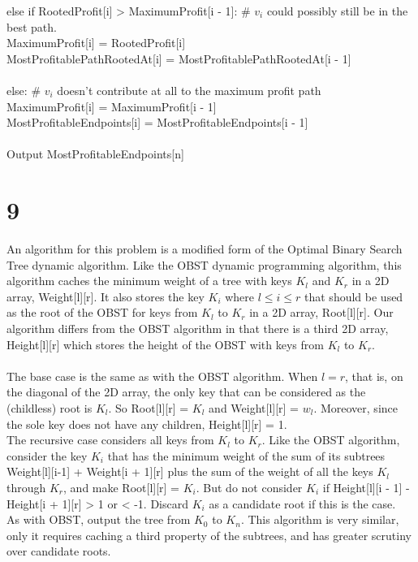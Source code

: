 \documentclass[letterpaper,notitlepage,twoside]{article}
\newcommand\tab[1][1cm]{\hspace*{#1}} %
\begin{document}
\tab else if RootedProfit[i] > MaximumProfit[i - 1]: \# $v_i$ could possibly still be in the best path.\\
\tab\tab MaximumProfit[i] = RootedProfit[i]\\
\tab\tab MostProfitablePathRootedAt[i] = MostProfitablePathRootedAt[i - 1]\\
\\
\tab else: \# $v_i$ doesn't contribute at all to the maximum profit path\\
\tab\tab MaximumProfit[i] = MaximumProfit[i - 1]\\
\tab\tab MostProfitableEndpoints[i] = MostProfitableEndpoints[i - 1]\\
\\
Output MostProfitableEndpoints[n]

\section*{9}
An algorithm for this problem is a modified form of the Optimal Binary Search Tree dynamic algorithm. Like the OBST dynamic programming algorithm, this algorithm caches the minimum weight of a tree with keys $K_l$ and $K_r$ in a 2D array, Weight[l][r]. It also stores the key $K_i$ where $l \leq i \leq r$ that should be used as the root of the OBST for keys from $K_l$ to $K_r$ in a 2D array, Root[l][r]. Our algorithm differs from the OBST algorithm in that there is a third 2D array, Height[l][r] which stores the height of the OBST with keys from $K_l$ to $K_r$.\\
\\
The base case is the same as with the OBST algorithm. When $l = r$, that is, on the diagonal of the 2D array, the only key that can be considered as the (childless) root is $K_l$. So Root[l][r] = $K_l$ and Weight[l][r] = $w_l$. Moreover, since the sole key does not have any children, Height[l][r] = 1.
\\
The recursive case considers all keys from $K_l$ to $K_r$. Like the OBST algorithm, consider the key $K_i$ that has the minimum weight of the sum of its subtrees Weight[l][i-1] + Weight[i + 1][r] plus the sum of the weight of all the keys $K_l$ through $K_r$, and make Root[l][r] = $K_i$. But do not consider $K_i$ if Height[l][i - 1] - Height[i + 1][r] > 1 or < -1. Discard $K_i$ as a candidate root if this is the case.
\\
As with OBST, output the tree from $K_0$ to $K_n$. This algorithm is very similar, only it requires caching a third property of the subtrees, and has greater scrutiny over candidate roots.
\end{document}
